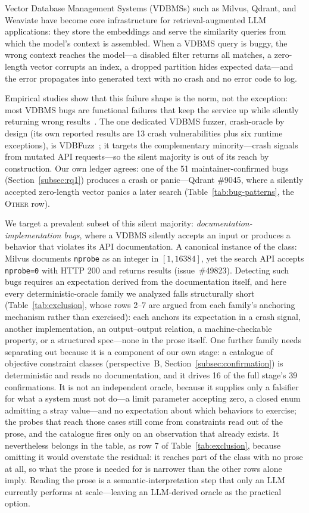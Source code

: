 \documentclass[acmsmall,screen,review,anonymous]{acmart}
\begin{document}
Vector Database Management Systems (VDBMSs) such as Milvus, Qdrant, and Weaviate have become core infrastructure for retrieval-augmented LLM applications: they store the embeddings and serve the similarity queries from which the model's context is assembled. When a VDBMS query is buggy, the wrong context reaches the model---a disabled filter returns all matches, a zero-length vector corrupts an index, a dropped partition hides expected data---and the error propagates into generated text with no crash and no error code to log.

Empirical studies show that this failure shape is the norm, not the exception: most VDBMS bugs are functional failures that keep the service up while silently returning wrong results~\cite{bugstudy25,roadmap25}. The one dedicated VDBMS fuzzer, crash-oracle by design (its own reported results are 13 crash vulnerabilities plus six runtime exceptions), is VDBFuzz~\cite{vdbfuzz26}; it targets the complementary minority---crash signals from mutated API requests---so the silent majority is out of its reach by construction. Our own ledger agrees: one of the 51 maintainer-confirmed bugs (Section~\ref{subsec:rq1}) produces a crash or panic---Qdrant \#9045, where a silently accepted zero-length vector panics a later search (Table~\ref{tab:bug-patterns}, the \textsc{Other} row).

We target a prevalent subset of this silent majority: \emph{documentation-implementation bugs}, where a VDBMS silently accepts an input or produces a behavior that violates its API documentation. A canonical instance of the class: Milvus documents \texttt{nprobe} as an integer in $[1, 16384]$, yet the search API accepts \texttt{nprobe=0} with HTTP 200 and returns results (issue~\#49823). Detecting such bugs requires an expectation derived from the documentation itself, and here every deterministic-oracle family we analyzed falls structurally short (Table~\ref{tab:exclusion}, whose rows 2--7 are argued from each family's anchoring mechanism rather than exercised): each anchors its expectation in a crash signal, another implementation, an output--output relation, a machine-checkable property, or a structured spec---none in the prose itself. One further family needs separating out because it is a component of our own stage: a catalogue of objective constraint classes (perspective~B, Section~\ref{subsec:confirmation}) is deterministic and reads no documentation, and it drives 16 of the full stage's 39 confirmations. It is not an independent oracle, because it supplies only a falsifier for what a system must not do---a limit parameter accepting zero, a closed enum admitting a stray value---and no expectation about which behaviors to exercise; the probes that reach those cases still come from constraints read out of the prose, and the catalogue fires only on an observation that already exists. It nevertheless belongs in the table, as row 7 of Table~\ref{tab:exclusion}, because omitting it would overstate the residual: it reaches part of the class with no prose at all, so what the prose is needed for is narrower than the other rows alone imply. Reading the prose is a semantic-interpretation step that only an LLM currently performs at scale---leaving an LLM-derived oracle as the practical option.
\end{document}
